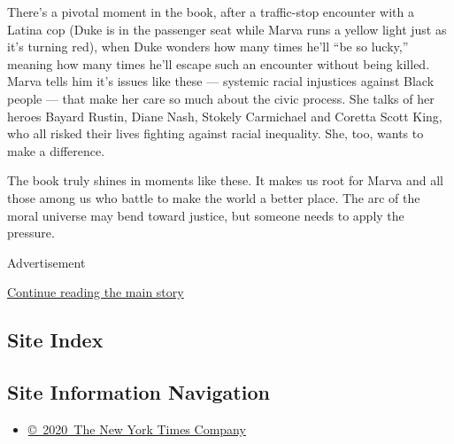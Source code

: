 There's a pivotal moment in the book, after a traffic-stop encounter
with a Latina cop (Duke is in the passenger seat while Marva runs a
yellow light just as it's turning red), when Duke wonders how many times
he'll ``be so lucky,'' meaning how many times he'll escape such an
encounter without being killed. Marva tells him it's issues like these
--- systemic racial injustices against Black people --- that make her
care so much about the civic process. She talks of her heroes Bayard
Rustin, Diane Nash, Stokely Carmichael and Coretta Scott King, who all
risked their lives fighting against racial inequality. She, too, wants
to make a difference.

The book truly shines in moments like these. It makes us root for Marva
and all those among us who battle to make the world a better place. The
arc of the moral universe may bend toward justice, but someone needs to
apply the pressure.

Advertisement

\protect\hyperlink{after-bottom}{Continue reading the main story}

\hypertarget{site-index}{%
\subsection{Site Index}\label{site-index}}

\hypertarget{site-information-navigation}{%
\subsection{Site Information
Navigation}\label{site-information-navigation}}

\begin{itemize}
\tightlist
\item
  \href{https://help.nytimes3xbfgragh.onion/hc/en-us/articles/115014792127-Copyright-notice}{©~2020~The
  New York Times Company}
\end{itemize}

